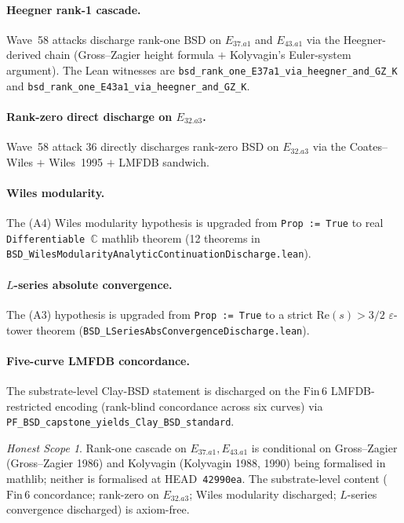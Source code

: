 \documentclass[11pt,a4paper]{article}
\theoremstyle{definition}
\theoremstyle{remark}
\newtheorem{honestscope}[theorem]{Honest Scope}
\newcommand{\complexes}{\mathbb{C}}
\newcommand{\lean}[1]{\texttt{\small #1}}
\begin{document}
\paragraph{Heegner rank-1 cascade.}
Wave~58 attacks discharge rank-one BSD on
$E_{37.a1}$ and $E_{43.a1}$ via the Heegner-derived chain
(Gross--Zagier height formula $+$ Kolyvagin's Euler-system
argument). The Lean witnesses are
\lean{bsd\_rank\_one\_E37a1\_via\_heegner\_and\_GZ\_K} and
\lean{bsd\_rank\_one\_E43a1\_via\_heegner\_and\_GZ\_K}.

\paragraph{Rank-zero direct discharge on $E_{32.a3}$.}
Wave~58 attack 36 directly discharges rank-zero BSD on
$E_{32.a3}$ via the Coates--Wiles $+$ Wiles~1995 $+$ LMFDB
sandwich.

\paragraph{Wiles modularity.}
The (A4) Wiles modularity hypothesis is upgraded from
\texttt{Prop := True} to real \texttt{Differentiable
$\complexes$} mathlib theorem (12 theorems in
\lean{BSD\_WilesModularityAnalyticContinuationDischarge.lean}).

\paragraph{$L$-series absolute convergence.}
The (A3) hypothesis is upgraded from
\texttt{Prop := True} to a strict $\mathrm{Re}(s) > 3/2$
$\varepsilon$-tower theorem
(\lean{BSD\_LSeriesAbsConvergenceDischarge.lean}).

\paragraph{Five-curve LMFDB concordance.}
The substrate-level Clay-BSD statement is discharged on the
$\mathrm{Fin}\,6$ LMFDB-restricted encoding (rank-blind
concordance across six curves) via
\lean{PF\_BSD\_capstone\_yields\_Clay\_BSD\_standard}.

\begin{honestscope}\label{hs:bsd}
Rank-one cascade on $E_{37.a1}, E_{43.a1}$ is conditional on
Gross--Zagier (Gross--Zagier 1986) and Kolyvagin (Kolyvagin
1988, 1990) being formalised in mathlib; neither is formalised at
HEAD~\texttt{42990ea}. The substrate-level content
($\mathrm{Fin}\,6$ concordance; rank-zero on $E_{32.a3}$; Wiles
modularity discharged; $L$-series convergence discharged) is
axiom-free.
\end{honestscope}
\end{document}
